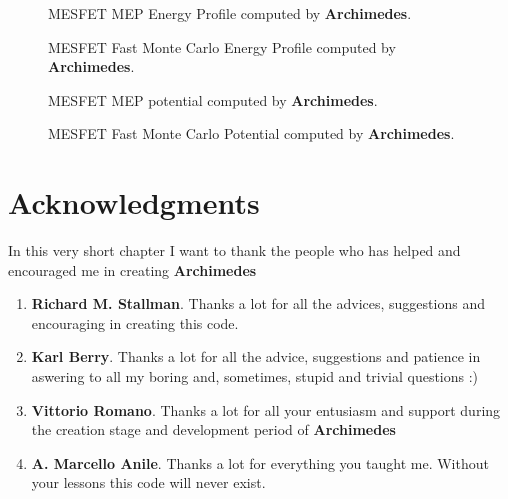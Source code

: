 \documentclass[12pt]{book}
\begin{document}
\begin{figure}[htb!]
\centerline{} 
\caption{\small MESFET MEP Energy Profile computed by \textbf{Archimedes}.}
\label{MESFET10}
\end{figure}

\begin{figure}[htb!]
\centerline{} 
\caption{\small MESFET Fast Monte Carlo Energy Profile computed by \textbf{Archimedes}.}
\label{MESFET11}
\end{figure}

\begin{figure}[htb!]
\centerline{} 
\caption{\small MESFET MEP potential computed by \textbf{Archimedes}.}
\label{MESFET4}
\centerline{} 
\caption{\small MESFET Fast Monte Carlo Potential computed by \textbf{Archimedes}.}
\label{MESFET5}
\end{figure}

\chapter{Acknowledgments}

In this very short chapter I want to thank the people who has helped and encouraged me in creating \textbf{Archimedes}

\begin{enumerate}
\item
\textbf{Richard M. Stallman}. Thanks a lot for all the advices, suggestions and encouraging in creating this code.
\item
\textbf{Karl Berry}. Thanks a lot for all the advice, suggestions and patience in aswering to all my boring and, sometimes, stupid and trivial questions :)
\item
\textbf{Vittorio Romano}. Thanks a lot for all your entusiasm and support during the creation stage and development period of \textbf{Archimedes}
\item
\textbf{A. Marcello Anile}. Thanks a lot for everything you taught me. Without your lessons this code will never exist.
\end{enumerate}


\end{document}

